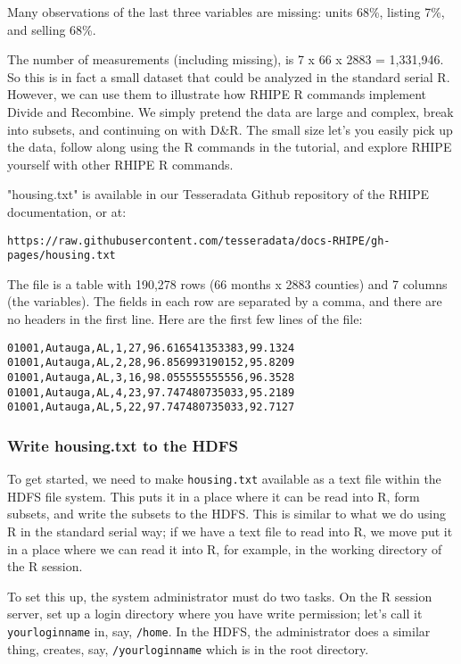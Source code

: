 Many observations of the last three variables are missing: units 68\%, listing
7\%, and selling 68\%.
 
The number of measurements (including missing), is 7 x 66 x 2883 = 1,331,946.
So this is in fact a small dataset that could be analyzed in the standard
serial R. However, we can use them to illustrate how RHIPE R commands implement
Divide and Recombine. We simply pretend the data are large and complex, break
into subsets, and continuing on with D\&R. The small size let's you easily
pick up the data, follow along using the R commands in the tutorial, and
explore RHIPE yourself with other RHIPE R commands.

"housing.txt" is available in our Tesseradata Github repository of the
RHIPE documentation, or at:
\begin{verbatim}
https://raw.githubusercontent.com/tesseradata/docs-RHIPE/gh-pages/housing.txt
\end{verbatim}

The file is a table with 190,278 rows (66 months x 2883 counties) and
7 columns (the variables). The fields in each row are separated by a comma,
and there are no headers in the first line. Here are the first few lines of
the file:

\begin{verbatim}
01001,Autauga,AL,1,27,96.616541353383,99.1324
01001,Autauga,AL,2,28,96.856993190152,95.8209
01001,Autauga,AL,3,16,98.055555555556,96.3528
01001,Autauga,AL,4,23,97.747480735033,95.2189
01001,Autauga,AL,5,22,97.747480735033,92.7127
\end{verbatim}

\subsubsection{Write housing.txt to the HDFS}

To get started, we need to make \texttt{housing.txt} available as a text file within
the HDFS file system. This puts it in a place where it can be read into R, form
subsets, and write the subsets to the HDFS. This is similar to what we do
using R in the standard serial way; if we have a text file to read into R, we
move put it in a place where we can read it into R, for example, in the working
directory of the R session.

To set this up, the system administrator must do two tasks.
On the R session server, set up a login directory where you have write
permission; let's call it \texttt{yourloginname} in, say, \texttt{/home}.
In the HDFS, the administrator does a similar thing, creates, say,
\texttt{/yourloginname} which is in the root directory.

